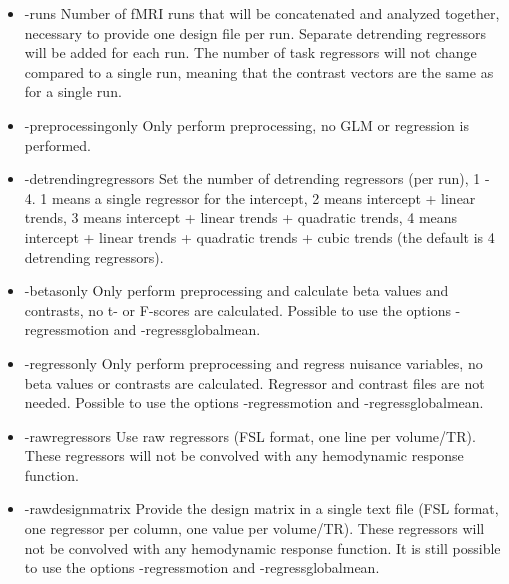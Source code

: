 \begin{itemize}

\item -runs
\newline \newline Number of fMRI runs that will be concatenated and analyzed together, necessary to provide one design file per run. Separate detrending regressors will be added for each run. The number of task regressors will not change compared to a single run, meaning that the contrast vectors are the same as for a single run.

\item -preprocessingonly
\newline \newline Only perform preprocessing, no GLM or regression is performed.

\item -detrendingregressors
\newline \newline Set the number of detrending regressors (per run), 1 - 4. 1 means a single regressor for the intercept, 2 means intercept + linear trends, 3 means intercept + linear trends + quadratic trends, 4 means intercept + linear trends + quadratic trends + cubic trends (the default is 4 detrending regressors).

\item -betasonly
\newline \newline Only perform preprocessing and calculate beta values and contrasts, no t- or F-scores are calculated. Possible to use the options -regressmotion and -regressglobalmean.

\item -regressonly
\newline \newline Only perform preprocessing and regress nuisance variables, no beta values or contrasts are calculated. Regressor and contrast files are not needed. Possible to use the options -regressmotion and -regressglobalmean.

\item -rawregressors
\newline \newline Use raw regressors (FSL format, one line per volume/TR). These regressors will not be convolved with any hemodynamic response function.

\item -rawdesignmatrix 
\newline \newline Provide the design matrix in a single text file (FSL format, one regressor per column, one value per volume/TR). These regressors will not be convolved with any hemodynamic response function. It is still possible to use the options -regressmotion and -regressglobalmean.


\end{itemize}
